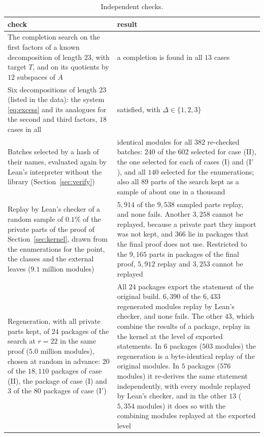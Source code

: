 \documentclass[11pt]{amsart}
\theoremstyle{definition}
\theoremstyle{remark}
\numberwithin{equation}{section}
\begin{document}
\begin{table}[ht]
\caption{Independent checks.}\label{tab:checks}
\centering
\begin{tabular}{@{}p{}p{}@{}}
\toprule
check & result\\
\midrule
The completion search on the first factors of a known decomposition of length $23$, with target $T$, and on its quotients by $12$ subspaces of $A$ & a completion is found in all $13$ cases\\
Six decompositions of length $23$ (listed in the data): the system \eqref{eq:excess} and its analogues for the second and third factors, $18$ cases in all & satisfied, with $\Delta\in\{1,2,3\}$\\
Batches selected by a hash of their names, evaluated again by Lean's interpreter without the library (Section~\ref{sec:verify}) & identical modules for all $382$ re-checked batches: $240$ of the $602$ selected for case (II), the one selected for each of cases (I) and (I$'$), and all $140$ selected for the enumerations; also all $89$ parts of the search kept as a sample of about one in a thousand\\
Replay by Lean's checker of a random sample of $0.1\%$ of the private parts of the proof of Section~\ref{sec:kernel}, drawn from the enumerations for the point, the classes and the external leaves ($9.1$ million modules) & $5{,}914$ of the $9{,}538$ sampled parts replay, and none fails. Another $3{,}258$ cannot be replayed, because a private part they import was not kept, and $366$ lie in packages that the final proof does not use. Restricted to the $9{,}165$ parts in packages of the final proof, $5{,}912$ replay and $3{,}253$ cannot be replayed\\
Regeneration, with all private parts kept, of $24$ packages of the search at $r=22$ in the same proof ($5.0$ million modules), chosen at random in advance: $20$ of the $18{,}110$ packages of case (II), the package of case (I) and $3$ of the $80$ packages of case (I$'$) & All $24$ packages export the statement of the original build. $6{,}390$ of the $6{,}433$ regenerated modules replay by Lean's checker, and none fails. The other $43$, which combine the results of a package, replay in the kernel at the level of exported statements. In $6$ packages ($503$ modules) the regeneration is a byte-identical replay of the original modules. In $5$ packages ($576$ modules) it re-derives the same statement independently, with every module replayed by Lean's checker, and in the other $13$ ($5{,}354$ modules) it does so with the combining modules replayed at the exported level\\
\bottomrule
\end{tabular}
\end{table}
\end{document}
